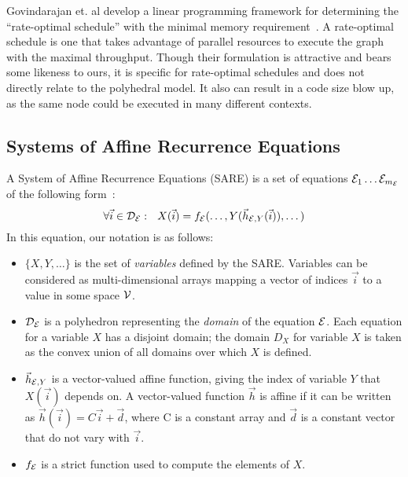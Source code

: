 Govindarajan et. al develop a linear programming framework for
determining the ``rate-optimal schedule'' with the minimal memory
requirement~\cite{GGD94}.  A rate-optimal schedule is one that takes
advantage of parallel resources to execute the graph with the maximal
throughput.  Though their formulation is attractive and bears some
likeness to ours, it is specific for rate-optimal schedules and does
not directly relate to the polyhedral model.  It also can result in a
code size blow up, as the same node could be executed in many
different contexts.

\subsection{Systems of Affine Recurrence Equations}

A System of Affine Recurrence Equations (SARE) is a set of equations
${\cal E}_1 \dots {\cal E}_{m_{\cal E}}$ of the following form~\cite{DRV00,Feautrier92i}:
\begin{equation}
\forall {\vec i} \in {\cal D_{\cal E}}:~~X({\vec i}) = f_{\cal E}(\dots, Y({\vec h}_{{\cal
E}, Y}({\vec i})), \dots)
\label{eq:sare}
\end{equation}
In this equation, our notation is as follows:
\begin{itemize}

\item $\{X, Y, \dots\}$ is the set of {\it variables} defined by the
SARE.  Variables can be considered as multi-dimensional arrays mapping
a vector of indices ${\vec i}$ to a value in some space ${\cal V}$.

\item ${\cal D_{\cal E}}$ is a polyhedron representing the {\it
domain} of the equation ${\cal E}$.  Each equation for a variable $X$
has a disjoint domain; the domain $D_X$ for variable $X$ is taken as
the convex union of all domains over which $X$ is defined.

\item ${\vec h}_{{\cal E}, Y}$ is a vector-valued affine function,
giving the index of variable $Y$ that $X({\vec i})$ depends on.  A
vector-valued function ${\vec h}$ is affine if it can be written as
${\vec h}({\vec i}) = C{\vec i} + {\vec d}$, where C is a constant
array and ${\vec d}$ is a constant vector that do not vary with ${\vec
i}$.

\item $f_{\cal E}$ is a strict function used to compute the elements
of $X$.

\end{itemize}

